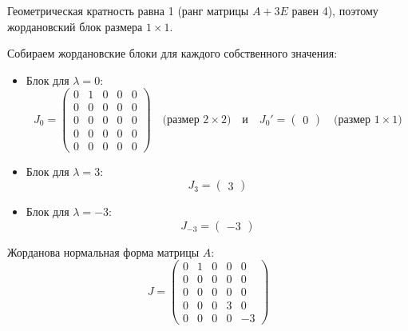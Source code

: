 \documentclass[a4paper]{article}
\begin{document}
\begin{enumerate}
\begin{itemize}
    Геометрическая кратность равна 1 (ранг матрицы $A + 3E$ равен 4),
     поэтому жордановский блок размера $1 \times 1$.
  \end{itemize}

  Собираем жордановские блоки для каждого собственного значения:

  \begin{itemize}
    \item Блок для $\lambda = 0$: 
      $$
      J_0 = \begin{pmatrix}
      0 & 1 & 0 & 0 & 0 \\
      0 & 0 & 0 & 0 & 0 \\
      0 & 0 & 0 & 0 & 0 \\
      0 & 0 & 0 & 0 & 0 \\
      0 & 0 & 0 & 0 & 0
      \end{pmatrix} \quad \text{(размер $2 \times 2$)} \quad \text{и} \quad 
      J_0' = \begin{pmatrix}
      0
      \end{pmatrix} \quad \text{(размер $1 \times 1$)}
      $$

    \item Блок для $\lambda = 3$: 
      $$
      J_3 = \begin{pmatrix}
      3
      \end{pmatrix}
      $$

    \item Блок для $\lambda = -3$: 
      $$
      J_{-3} = \begin{pmatrix}
      -3
      \end{pmatrix}
      $$
  \end{itemize}

  Жорданова нормальная форма матрицы $A$:
  $$
  J = \begin{pmatrix}
  0 & 1 & 0 & 0 & 0 \\
  0 & 0 & 0 & 0 & 0 \\
  0 & 0 & 0 & 0 & 0 \\
  0 & 0 & 0 & 3 & 0 \\
  0 & 0 & 0 & 0 & -3
  \end{pmatrix}
  $$



\end{enumerate}
\end{document}
